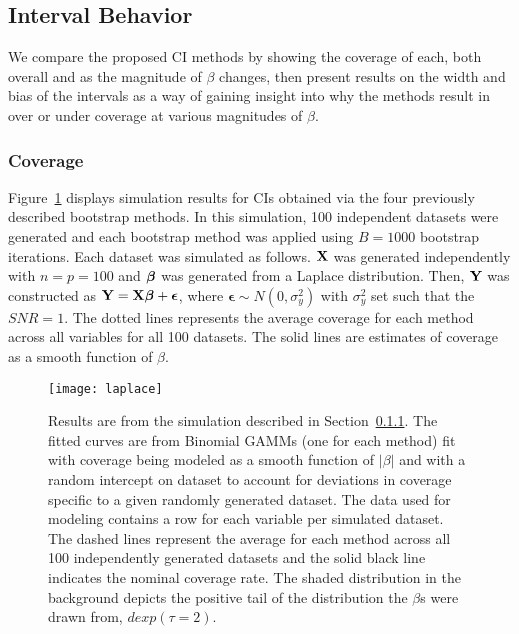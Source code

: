 
\subsection{Interval Behavior}

We compare the proposed CI methods by showing the coverage of each, both overall and as the magnitude of $\beta$ changes, then present results on the width and bias of the intervals as a way of gaining insight into why the methods result in over or under coverage at various magnitudes of $\beta$.

\subsubsection{Coverage}\label{Sec:Coverage}

Figure~\ref{Fig:laplace} displays simulation results for CIs obtained via the four previously described bootstrap methods. In this simulation, 100 independent datasets were generated and each bootstrap method was applied using $B = 1000$ bootstrap iterations. Each dataset was simulated as follows. $\mathbf{X}$ was generated independently with $n = p = 100$ and $\boldsymbol{\beta}$ was generated from a Laplace distribution. Then, $\mathbf{Y}$ was constructed as $\mathbf{Y} = \mathbf{X}\boldsymbol{\beta} + \boldsymbol{\epsilon}$, where $\boldsymbol{\epsilon} \sim N(0, \sigma^2_y)$ with $\sigma^2_y$ set such that the $SNR = 1$. The dotted lines represents the average coverage for each method across all variables for all 100 datasets. The solid lines are estimates of coverage as a smooth function of $\beta$.

\begin{figure}[hbtp]
  \texttt{[image: laplace]}
  \caption{\label{Fig:laplace} Results are from the simulation described in Section~\ref{Sec:Coverage}. The fitted curves are from Binomial GAMMs (one for each method) fit with coverage being modeled as a smooth function of $|\beta|$ and with a random intercept on dataset to account for deviations in coverage specific to a given randomly generated dataset. The data used for modeling contains a row for each variable per simulated dataset. The dashed lines represent the average for each method across all 100 independently generated datasets and the solid black line indicates the nominal coverage rate. The shaded distribution in the background depicts the positive tail of the distribution the $\beta$s were drawn from, $dexp(\tau = 2)$.}
\end{figure}

